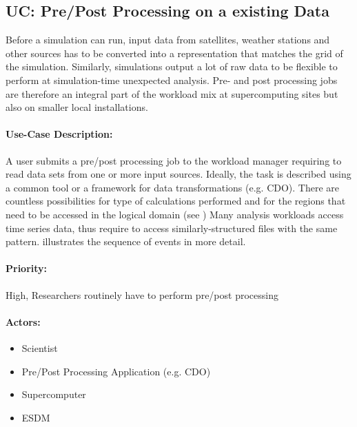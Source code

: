 \subsection{UC: Pre/Post Processing on a existing Data}
\label{uc: pre + post processing}

Before a simulation can run, input data from satellites, weather stations and other sources has to be converted into a representation that matches the grid of the simulation.
Similarly, simulations output a lot of raw data to be flexible to perform at simulation-time unexpected analysis.
Pre- and post processing jobs are therefore an integral part of the workload mix at supercomputing sites but also on smaller local installations.


\paragraph{Use-Case Description:}
A user submits a pre/post processing job to the workload manager requiring to read data sets from one or more input sources.
Ideally, the task is described using a common tool or a framework for data transformations (e.g. CDO).
There are countless possibilities for type of calculations performed and for the regions that need to be accessed in the logical domain (see )
Many analysis workloads access time series data, thus require to access similarly-structured files with the same pattern.
 illustrates the sequence of events in more detail.

\paragraph{Priority:} High, Researchers routinely have to perform pre/post processing

\paragraph{Actors:}
\begin{itemize}
	\item Scientist
	\item Pre/Post Processing Application (e.g. CDO)
	\item Supercomputer
	\item ESDM
\end{itemize}


